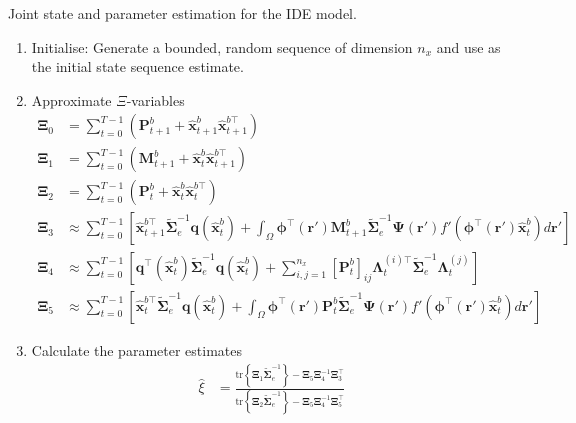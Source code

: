 \documentclass[]{article}
\begin{document}
\begin{algorithm}\footnotesize
\caption{Joint state and parameter estimation for the IDE model.}
\label{alg:EM-EMAlgorithm}
\begin{enumerate}
\item  Initialise:
Generate a bounded, random sequence of dimension $n_x$ and use as the initial state sequence estimate.
\item Approximate $\Xi$-variables
\begin{align}
	\boldsymbol\Xi_{0}&=\sum_{t=0}^{T-1}\left(\mathbf P_{t+1}^b+\mathbf{\hat x}_{t+1}^b\mathbf{\hat x}_{t+1}^{b\top}\right)\nonumber \\
\boldsymbol\Xi_{1}&=\sum_{t=0}^{T-1}\left(\mathbf M_{t+1}^b+\mathbf{\hat x}_t^b\mathbf{\hat x}_{t+1}^{b\top}\right)\nonumber\\
\boldsymbol\Xi_{2}&=\sum_{t=0}^{T-1}\left(\mathbf P_t^b+\mathbf{\hat x}_t^b\mathbf{\hat x}_t^{b\top}\right)\nonumber\\
\boldsymbol\Xi_{3}&\approx\sum_{t=0}^{T-1}\left[ \mathbf{\hat x}_{t+1}^{b\top}\tilde{\boldsymbol\Sigma}_e^{-1}\mathbf q(\mathbf{\hat x}_t^b)+\int_\Omega\boldsymbol \phi^\top(\mathbf r') \mathbf M_{t+1}^b \tilde{\boldsymbol\Sigma}_e^{-1} \boldsymbol{\Psi}(\mathbf{r}') f'(\boldsymbol \phi^\top(\mathbf r')\mathbf {\hat x}_t^b) d\mathbf{r}'\right]  \nonumber \\	
\boldsymbol\Xi_{4}&\approx\sum_{t=0}^{T-1}\left[\mathbf q^\top(\mathbf{\hat x}_t^b)\tilde{\boldsymbol\Sigma}_e^{-1}\mathbf q(\mathbf{\hat x}_t^b)+\sum_{i,j=1}^{n_x}[\mathbf{P}_t^b]_{ij}{\boldsymbol\Lambda}_t^{(i)\top}\tilde{\boldsymbol\Sigma}_e^{-1}{\boldsymbol\Lambda}_t^{(j)}\right]\nonumber\\
 \boldsymbol\Xi_{5}&\approx\sum_{t=0}^{T-1}\left[ \mathbf{\hat x}_{t}^{b\top}\tilde{\boldsymbol\Sigma}_e^{-1}\mathbf q(\mathbf{\hat x}_t^b)+\int_\Omega\boldsymbol \phi^\top(\mathbf r') \mathbf P_t^b \tilde{\boldsymbol\Sigma}_e^{-1}  \boldsymbol{\Psi}(\mathbf{r}') f'(\boldsymbol \phi^\top(\mathbf r')\mathbf {\hat x}_t^b) d\mathbf{r}'\right] \nonumber
 \end{align}
\item Calculate the parameter estimates
\begin{align}
 \hat{\xi}&=\frac{\mathrm{tr}\left\lbrace \boldsymbol\Xi_1 \tilde{\boldsymbol\Sigma}_e^{-1}\right\rbrace-\boldsymbol\Xi_5\boldsymbol\Xi_4^{-1}\boldsymbol\Xi_3^\top}{\mathrm{tr}\left\lbrace \boldsymbol\Xi_2 \tilde{\boldsymbol\Sigma}_e^{-1}\right\rbrace-\boldsymbol\Xi_5\boldsymbol\Xi_4^{-1}\boldsymbol\Xi_5^{\top}} \nonumber\\

\end{align}
\end{enumerate}
\end{algorithm}
\end{document}
